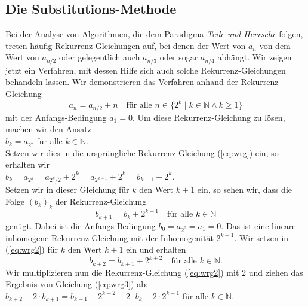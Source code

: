 \subsection{Die Substitutions-Methode}
Bei der Analyse von Algorithmen, die dem Paradigma \emph{Teile-und-Herrsche} folgen,
treten h\"{a}ufig Rekurrenz-Gleichungen auf, bei denen der Wert von $a_n$ von dem Wert von
$a_{n/2}$ oder gelegentlich auch $a_{n/3}$ oder sogar $a_{n/4}$ abh\"{a}ngt.  Wir zeigen jetzt
ein Verfahren, mit dessen Hilfe sich auch solche Rekurrenz-Gleichungen behandeln lassen.
Wir demonstrieren das Verfahren anhand der Rekurrenz-Gleichung 
\begin{equation}
  \label{eq:wrg}
a_n = a_{n/2} + n \quad \mbox{f\"{u}r alle $n \in \{ 2^k \mid k \in \mathbb{N} \wedge k \geq 1\}$}  
\end{equation}
mit der Anfangs-Bedingung $a_1 = 0$.   Um diese Rekurrenz-Gleichung zu l\"{o}sen, machen wir
den Ansatz \\
\hspace*{1.3cm} $b_k = a_{2^k}$ \quad f\"{u}r alle $k \in \mathbb{N}$. \\[0.2cm]
 Setzen wir dies in die
urspr\"{u}ngliche Rekurrenz-Gleichung (\ref{eq:wrg}) ein, so erhalten wir \\[0.2cm]
\hspace*{1.3cm} 
$b_{k} = a_{2^{k}} = a_{2^{k}/2} + 2^{k} = a_{2^{k-1}} + 2^{k} = b_{k-1}+ 2^{k}$.
\\[0.2cm]
Setzen wir in dieser Gleichung f\"{u}r $k$ den Wert $k+1$ ein, so sehen wir, dass
die Folge $(b_k)_k$ der Rekurrenz-Gleichung 
\begin{equation}
  \label{eq:wrg2}
  b_{k+1} = b_k + 2^{k+1} \quad \mbox{f\"{u}r alle $k \in \mathbb{N}$}
\end{equation}
gen\"{u}gt.  Dabei ist die Anfangs-Bedingung $b_0 = a_{2^0} = a_1 = 0$.  Das ist eine lineare
inhomogene Rekurrenz-Gleichung mit der Inhomogenit\"{a}t $2^{k+1}$. Wir 
setzen in (\ref{eq:wrg2}) f\"{u}r $k$ den Wert $k+1$
ein und erhalten 
\begin{equation}
  \label{eq:wrg3}
  b_{k+2} = b_{k+1} + 2^{k+2} \quad \mbox{f\"{u}r alle $k \in \mathbb{N}$.}
\end{equation}
Wir multiplizieren nun die Rekurrenz-Gleichung (\ref{eq:wrg2}) mit 2 und ziehen das Ergebnis
von Gleichung  (\ref{eq:wrg3}) ab: \\[0.2cm]
\hspace*{1.3cm} 
$b_{k+2} - 2 \cdot b_{k+1} = b_{k+1} + 2^{k+2} - 2 \cdot b_k - 2 \cdot 2^{k+1}$ \quad f\"{u}r alle $k \in \mathbb{N}$. 
